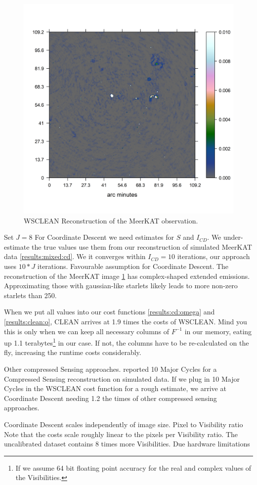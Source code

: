 \begin{figure}[h]
	\centering
	\includegraphics[width=0.6\linewidth]{./chapters/21.scalability/meerkat.png}
	\caption{WSCLEAN Reconstruction of the MeerKAT observation.}
	\label{scale:wsclean}
\end{figure}

Set $J=8$
For Coordinate Descent we need estimates for $S$ and $I_{CD}$. We under-estimate the true values use them from our reconstruction of simulated MeerKAT data \ref{results:mixed:cd}. We it converges within $I_{CD}=10$ iterations, our approach uses $10*J$ iterations.
Favourable assumption for Coordinate Descent. The reconstruction of the MeerKAT image \ref{scale:wsclean} has complex-shaped extended emissions. Approximating those with gaussian-like starlets likely leads to more non-zero starlets than 250.

When we put all values into our cost functions \eqref{results:cd:omega} and \eqref{results:clean:o}, CLEAN arrives at 1.9 times the costs of WSCLEAN. Mind you this is only when we can keep all necessary columns of $F^{-1}$ in our memory, eating up 1.1 terabytes\footnote{If we assume 64 bit floating point accuracy for the real and complex values of the Visibilities.} in our case. If not, the columns have to be re-calculated on the fly, increasing the runtime costs considerably.

Other compressed Sensing approaches. \cite{pratley2018fast} reported 10 Major Cycles for a Compressed Sensing reconstruction on simulated data. If we plug in 10 Major Cycles in the WSCLEAN cost function for a rough estimate, we arrive at Coordinate Descent needing 1.2 the times of other compressed sensing approaches.

Coordinate Descent scales independently of image size.
Pixel to Visibility ratio
Note that the costs scale roughly linear to the pixels per Visibility ratio.
The uncalibrated dataset contains 8 times more Visibilities. Due hardware limitations

